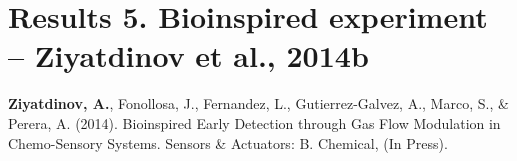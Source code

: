 
\thispagestyle{empty}


\begingroup
\let\clearpage\relax
\let\cleardoublepage\relax
\let\cleardoublepage\relax

\vspace*{3cm}

  {
    \section{Results 5. Bioinspired experiment -- Ziyatdinov et al., 2014b}\label{pub5}
  }

\medskip

\noindent \textbf{Ziyatdinov, A.}, Fonollosa, J., Fernandez, L., Gutierrez-Galvez, A., Marco, S., \& Perera, A. (2014). 
Bioinspired Early Detection through Gas Flow Modulation in Chemo-Sensory Systems. 
Sensors \& Actuators: B. Chemical, (In Press).
\cite{Ziyatdinov2014b}

\endgroup			

\vfill
